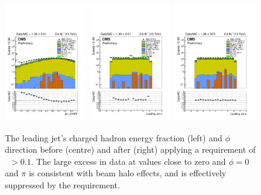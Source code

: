 \begin{figure}
\begin{center}
\includegraphics[width=0.32\textwidth]{figs/analysis/jet_chHEF_mono_all_before.pdf}
\includegraphics[width=0.32\textwidth]{figs/analysis/jet_phi[0]_mono_all_before.pdf}
\includegraphics[width=0.32\textwidth]{figs/analysis/jet_phi[0]_mono_all_after.pdf}
\caption{The leading jet's charged hadron energy fraction (left) and $\phi$ 
direction before (centre) and after (right) applying a requirement of 
\chf~$>0.1$. The large excess in data at \chf values close to zero and $\phi = 
0$ and $\pi$ is consistent with beam halo effects, and is effectively 
suppressed by the \chf requirement.}
\label{fig:beamhalo}
\end{center}
\end{figure}

